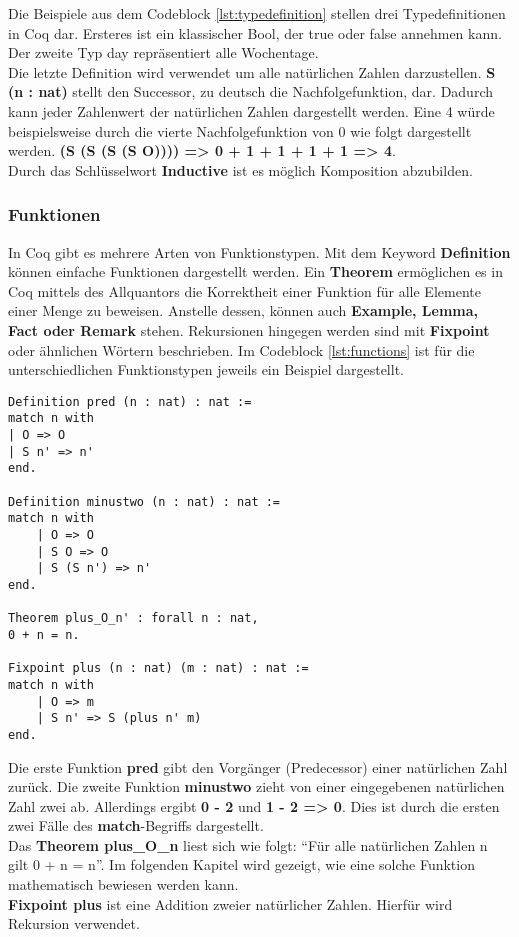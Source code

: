 Die Beispiele aus dem Codeblock \ref{lst:typedefinition} stellen drei Typedefinitionen in Coq dar. Ersteres ist ein klassischer Bool, der true oder false annehmen kann. Der zweite Typ day repräsentiert alle Wochentage. \\
Die letzte Definition wird verwendet um alle natürlichen Zahlen darzustellen. \textbf{S (n : nat)} stellt den Successor, zu deutsch die Nachfolgefunktion, dar. Dadurch kann jeder Zahlenwert der natürlichen Zahlen dargestellt werden. Eine 4 würde beispielsweise durch die vierte Nachfolgefunktion von 0 wie folgt dargestellt werden. \textbf{(S (S (S (S O)))) => 0 + 1 + 1 + 1 + 1 => 4}.\\
Durch das Schlüsselwort \textbf{Inductive} ist es möglich Komposition abzubilden.

\subsubsection{Funktionen}
In Coq gibt es mehrere Arten von Funktionstypen. Mit dem Keyword \textbf{Definition} können einfache Funktionen dargestellt werden.
Ein \textbf{Theorem} ermöglichen es in Coq mittels des Allquantors die Korrektheit einer Funktion für alle Elemente einer Menge zu beweisen. 
Anstelle dessen, können auch \textbf{Example, Lemma, Fact oder Remark} stehen.
Rekursionen hingegen werden sind mit \textbf{Fixpoint} oder ähnlichen Wörtern beschrieben.
Im Codeblock \ref{lst:functions} ist für die unterschiedlichen Funktionstypen jeweils ein Beispiel dargestellt.
\begin{lstlisting}[language=coq,firstnumber=1,caption=Coq Funktionen,label=lst:functions]
Definition pred (n : nat) : nat :=
match n with
| O => O
| S n' => n'
end.

Definition minustwo (n : nat) : nat :=
match n with
	| O => O
	| S O => O
	| S (S n') => n'
end.

Theorem plus_O_n' : forall n : nat,
0 + n = n.

Fixpoint plus (n : nat) (m : nat) : nat :=
match n with
	| O => m
	| S n' => S (plus n' m)
end.
\end{lstlisting}
Die erste Funktion \textbf{pred} gibt den Vorgänger (Predecessor) einer natürlichen Zahl zurück.
Die zweite Funktion \textbf{minustwo} zieht von einer eingegebenen natürlichen Zahl zwei ab. Allerdings ergibt \textbf{0 - 2} und \textbf{1 - 2 => 0}. Dies ist durch die ersten zwei Fälle des \textbf{match}-Begriffs dargestellt.\\
Das \textbf{Theorem plus\_O\_n} liest sich wie folgt: "`Für alle natürlichen Zahlen n gilt 0 + n = n"'. Im folgenden Kapitel wird gezeigt, wie eine solche Funktion mathematisch bewiesen werden kann.\\
\textbf{Fixpoint plus} ist eine Addition zweier natürlicher Zahlen. Hierfür wird Rekursion verwendet.

